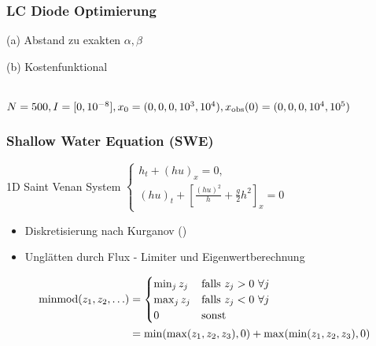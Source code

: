 \begin{frame}[<+->]
\frametitle{LC Diode Optimierung}
\begin{minipage}{0.45\linewidth}
\centering
 
(a) Abstand zu exakten $\alpha,\beta$
\end{minipage}
\begin{minipage}{0.45\linewidth}
\centering
 
(b) Kostenfunktional
\end{minipage}
 \centering
 \\[0.3cm]
  $N=500,I=[0,10^{-8}],x_0=(0,0,0,10^3,10^{4}),x_\text{obs}(0)=(0,0,0,10^4,10^5)$
\end{frame}


\begin{frame}[<+->]
\frametitle{Shallow Water Equation (SWE)}
\begin{minipage}{0.45\linewidth}

\end{minipage}
\begin{minipage}{0.54\linewidth}
 \begin{block}{1D Saint Venan System}
     \centering
     $\begin{cases}
 h_t + (hu)_x = 0,\\
 (hu)_t + \left[\frac{(hu)^2}{h} + \frac{g}{2}h^2\right]_x = 0
\end{cases} $
    \end{block}
   \begin{itemize}
    \item Diskretisierung nach Kurganov (\cite{kurganov2007second})
    \item Unglätten durch Flux - Limiter und Eigenwertberechnung
   \end{itemize}                           
\end{minipage}
\pause
\begin{align*}
\operatorname{minmod}(z_1,z_2,\ldots) &= \begin{cases}
                                  \min_j z_j & \text{falls }z_j>0~\forall j\\
                                  \max_j z_j & \text{falls }z_j<0~\forall j\\
                                  0 & \text{sonst}
                                 \end{cases}\\
&= \min(\max(z_1,z_2,z_3),0) + \max(\min(z_1,z_2,z_3),0)                                 
\end{align*}
\end{frame}

